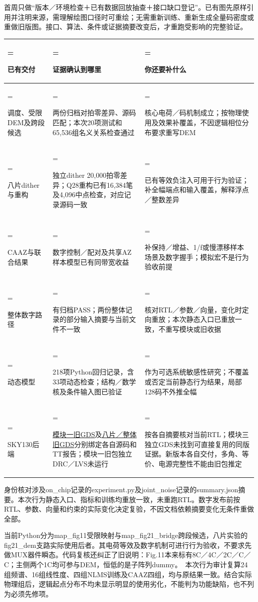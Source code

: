 \documentclass[zihao=5,a4paper,fontset=none]{ctexart}
\begin{document}
首周只做``版本／环境检查＋已有数据回放抽查＋接口缺口登记''。已有图先原样引用并注明来源，需理解绘图口径时可重绘；无需重新训练、重新生成全量码密度或重做旧版图。接口、算法、条件或证据摘要改变后，才重跑受影响的完整验证。

\begin{table}[H]
\small
  \centering
  \begin{tabularx}{\linewidth}{>{\hsize=0.65\hsize\linewidth=\hsize\raggedright\arraybackslash}X>{\hsize=1.25\hsize\linewidth=\hsize\raggedright\arraybackslash}X>{\hsize=1.1\hsize\linewidth=\hsize\raggedright\arraybackslash}X}
    \toprule
    已有交付 & 证据确认到哪里 & 你还要补什么 \\
    \midrule
    调度、受限DEM及跨段候选 & 两份归档对拍零差异、源码匹配；本次20项测试和65,536组名义关系检查通过 & 核心电荷／码机制成立；按物理使用及效果补覆盖，不因逻辑相位分布要求重写DEM \\
    八片dither与重构 & 独立dither 20,000拍零差异；Q28重构已有16,384笔及4,096中点检查，对应记录源码一致 & 已有等效负注入可用于行为验证；补全幅端点和输入覆盖，解释浮点／整数差异 \\
    CAAZ与联合结果 & 数字控制／配对及共享AZ样本模型已有同带宽收益 & 补保持／增益、1/f或慢漂移样本场景及数字握手；模拟宏不是行为验收前提 \\
    整体数字路径 & 有归档PASS；两份整体记录的部分输入摘要与当前文件不一致 & 核对RTL／参数／向量，变化时定向重放；本次静态入口已重放一致，不重写模块或旧收据 \\
    动态模型 & 218项Python回归记录，含33项动态检查；结构／数学核及条件输入图已验证 & 作为可选系统敏感性研究；不覆盖或否定当前静态行为结果，局部128码不外推全幅 \\
    SKY130后端 & \href{../task1/physical/README.md}{模块一旧GDS}及\href{../task2/physical/README.md}{八片／整体旧GDS}分别绑定各自源码和TT报告；模块一旧包独立DRC／LVS未运行 & 按各自摘要核对当前RTL；模块三独立GDS未找到可直接复用的同版证据。新版本各自交付，多角、等价、电源完整性不能由旧包推定 \\
    \bottomrule
  \end{tabularx}
\end{table}

身份核对涉及on\_chip记录的experiment.py及joint\_noise记录的summary.json摘要。本次行为静态入口、指标和训练均重放一致，未重跑RTL。数字发布前按RTL、参数、向量和约束的实际变化决定复验，不因文档依赖摘要变化无条件重做全部。

当前Python分为map\_fig11受限映射与map\_fig21\_bridge跨段候选，八片实验的fig21\_dem支路实际使用后者。其电荷等效及数字机制可进行行为验收，不要求先做MUX器件瞬态。代码复核还纠正了旧说明：Fig.11本来标有8C／4C／2C／C／C；主侧两个1C均可参与DEM，恒低的是子阵列dummy。~本次行为审计复算24组频谱、16组线性度、四组NLMS训练及CAAZ四组，均与原结果一致。结合实际物理组后，逻辑起点分布不均未显示明显的使用劣化，不能判为功能缺陷，也不列为必须先修项。
\end{document}

